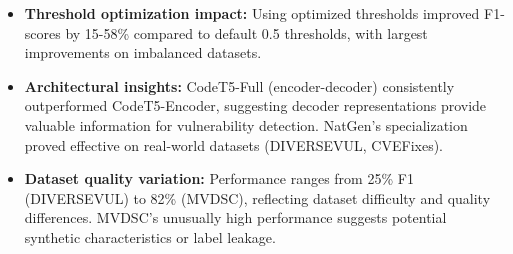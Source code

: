 \documentclass[letterpaper]{article}
\begin{document}
\begin{table}[ht]
	\centering
	\caption{Model Performance (F1-Score \%) with Optimized Thresholds}
	\label{tab:results}
\end{table}

\begin{itemize}
	\item \textbf{Threshold optimization impact:} Using optimized thresholds improved F1-scores by 15-58\% compared to default 0.5 thresholds, with largest improvements on imbalanced datasets.
	\item \textbf{Architectural insights:} CodeT5-Full (encoder-decoder) consistently outperformed CodeT5-Encoder, suggesting decoder representations provide valuable information for vulnerability detection. NatGen's specialization proved effective on real-world datasets (DIVERSEVUL, CVEFixes).
	\item \textbf{Dataset quality variation:} Performance ranges from 25\% F1 (DIVERSEVUL) to 82\% (MVDSC), reflecting dataset difficulty and quality differences. MVDSC's unusually high performance suggests potential synthetic characteristics or label leakage.
\end{itemize}
\end{document}

